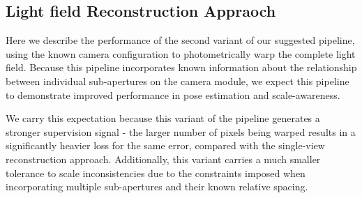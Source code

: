 \subsection{Light field Reconstruction Appraoch}

Here we describe the performance of the second variant of our suggested pipeline, using the known camera configuration to photometrically warp the complete light field. Because this pipeline incorporates known information about the relationship between individual sub-apertures on the camera module, we expect this pipeline to demonstrate improved performance in pose estimation and scale-awareness.

We carry this expectation because this variant of the pipeline generates a stronger supervision signal - the larger number of pixels being warped results in a significantly heavier loss for the same error, compared with the single-view reconstruction approach. Additionally, this variant carries a much smaller tolerance to scale inconsistencies due to the constraints imposed when incorporating multiple sub-apertures and their known relative spacing.


